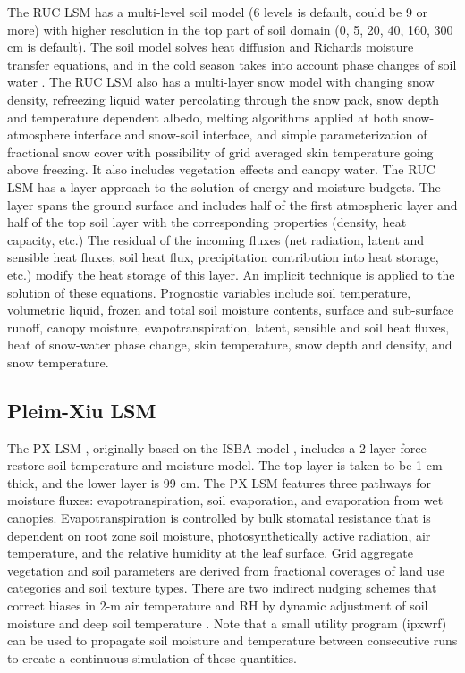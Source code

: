 The RUC LSM has a multi-level soil model (6 levels is default, could be 9 or more) with higher resolution in the top part of soil domain 
(0, 5, 20, 40, 160, 300 cm is default). The soil model solves heat diffusion and Richards moisture transfer equations, and in the cold season
takes into account phase changes of soil water \citep{smirnova97, smirnova00}. 
The RUC LSM also has a multi-layer snow model with changing snow density, refreezing liquid water 
percolating through the snow pack, snow depth and temperature dependent albedo, melting algorithms applied at both 
snow-atmosphere interface and snow-soil interface, and simple parameterization of fractional snow cover with possibility of 
grid averaged skin temperature going above freezing. It also includes vegetation effects and canopy water.
The RUC LSM has a layer approach to the solution of energy and moisture budgets. 
The layer spans the ground surface and includes half of the first atmospheric layer and half of the top soil layer with the 
corresponding properties (density, heat capacity, etc.) The residual of the incoming fluxes (net radiation, latent and sensible heat fluxes, 
soil heat flux, precipitation contribution into heat storage, etc.) modify the heat storage of this layer. 
An implicit technique is applied to the solution of these equations.
Prognostic variables include soil temperature, volumetric liquid, frozen and total soil moisture contents, 
surface and sub-surface runoff, canopy moisture, evapotranspiration, latent, sensible and soil heat fluxes, 
heat of snow-water phase change, skin temperature, snow depth and density, and snow temperature. 

\subsection{Pleim-Xiu LSM}

The PX LSM \citep{pleim95, xiu01}, originally based on the ISBA model \citet{noilhan89}, includes a 2-layer force-restore soil temperature and moisture model.  The top layer is taken to be 1 cm thick, and the lower layer is 99 cm. The PX LSM features three pathways for moisture fluxes: evapotranspiration, soil evaporation, and evaporation from wet canopies.  Evapotranspiration is controlled by bulk stomatal resistance that is dependent on root zone soil moisture, photosynthetically active radiation, air temperature, and the relative humidity at the leaf surface.   Grid aggregate vegetation and soil parameters are derived from fractional coverages of land use categories and soil texture types.  There are two indirect nudging schemes that correct biases in 2-m air temperature and RH by dynamic adjustment of soil moisture \citep{pleim03} and deep soil temperature \citep{pleim08}.  Note that a small utility program (ipxwrf) can be used to propagate soil moisture and temperature between consecutive runs to create a continuous simulation of these quantities.

